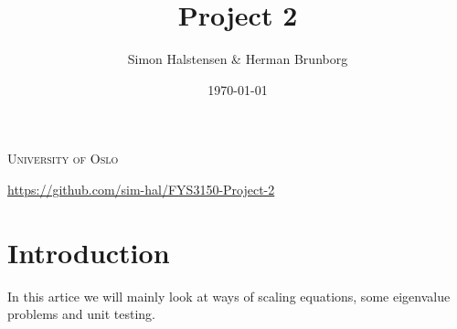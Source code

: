 \documentclass[english,notitlepage]{revtex4-1}  %
\begin{document}
\title{Project 2}      %
\author{Simon Halstensen \& Herman Brunborg}          %
\textsc{University of Oslo}
\date{\today}                             %
\noaffiliation                            %




\maketitle 

\url{https://github.com/sim-hal/FYS3150-Project-2}

\section*{Introduction}
    
In this artice we will mainly look at ways of scaling equations, some eigenvalue problems and unit testing.
\end{document}
